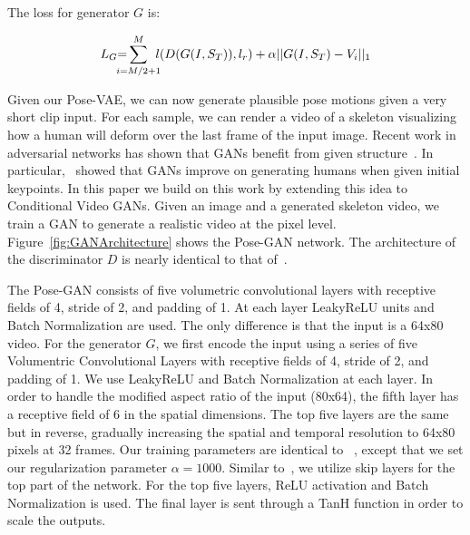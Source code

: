 The loss for generator $G$ is:

\vspace{-.5cm}
\begin{equation}
\begin{split}
L_{G} \hspace{-.1cm} = \hspace{-.4cm} \sum_{i=M/2+1}^{M} \hspace{-.2cm} l(D(G(I, S_{T})),l_r) +
\vspace{-10.0cm} \alpha||G(I, S_{T}) - V_{i}||_1
\end{split}
\end{equation}
\vspace{-.5cm}

Given our Pose-VAE, we can now generate plausible pose motions given a very short clip input. For each sample, we can render a video of a skeleton visualizing how a human will deform over the last frame of the input image. Recent work in adversarial networks has shown that GANs benefit from given structure~\cite{Isola16, Pathak16, Reed16}. In particular,~\cite{Reed16} showed that GANs improve on generating humans when given initial keypoints. In this paper we build on this work by extending this idea to Conditional Video GANs. Given an image and a generated skeleton video, we train a GAN to generate a realistic video at the pixel level. Figure~\ref{fig:GANArchitecture} shows the Pose-GAN network. The architecture of the discriminator $D$ is nearly identical to that of~\cite{Vondrick16}. 

 The Pose-GAN consists of five volumetric convolutional layers with receptive fields of 4, stride of 2, and padding of 1. At each layer LeakyReLU units and Batch Normalization are used. The only difference is that the input is a 64x80 video. For the generator $G$, we first encode the input using a series of five Volumentric Convolutional Layers with receptive fields of 4, stride of 2, and padding of 1. We use LeakyReLU and Batch Normalization at each layer. In order to handle the modified aspect ratio of the input (80x64), the fifth layer has a receptive field of 6 in the spatial dimensions. The top five layers are the same but in reverse, gradually increasing the spatial and temporal resolution to 64x80 pixels at 32 frames. Our training parameters are identical to ~\cite{Vondrick16}, except that we set our regularization parameter $\alpha=1000$. Similar to~\cite{Isola16}, we utilize skip layers for the top part of the network. For the top five layers, ReLU activation and Batch Normalization is used. The final layer is sent through a TanH function in order to scale the outputs. 

